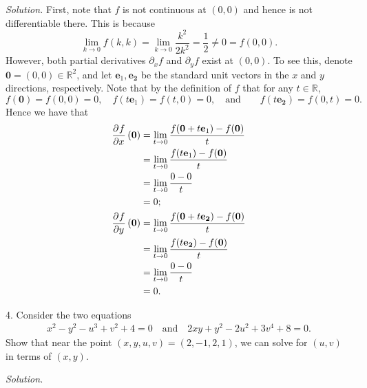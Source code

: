 \documentclass{article}
\newcommand{\0}{\mathbf{0}}
\newcommand{\ex}{\mathbf{e}_1}
\newcommand{\ey}{\mathbf{e_2}}
\newcommand{\R}{\mathbb{R}}
\begin{document}
\textit{Solution.}
First, note that $f$ is not continuous at $(0, 0)$ and hence is
not differentiable there. This is because
%
\begin{equation*}
    \lim_{k \to 0} f(k, k)
        = \lim_{k \to 0} \frac{k^2}{2 k^2}
        = \frac{1}{2} \neq 0
        = f(0, 0)
    .
\end{equation*}
%
However, both partial derivatives $\partial_x f$ and $\partial_y f$
exist at $(0, 0)$. To see this, denote $\0 = (0, 0) \in \R^2$, and let
$\ex, \ey$ be the standard unit vectors in the $x$ and $y$ directions,
respectively. Note that by the definition of $f$ that for any $t \in \R$,
%
\begin{equation*}
    f(\0) = f(0, 0) = 0, \quad
    f(t \ex) = f(t, 0) = 0, \quad
    \text{and} \qquad f(t \ey) = f(0, t) = 0
    .
\end{equation*}
%
Hence we have that
%
\begin{align*}
    \dpd{f}{x}(\0)
        &= \lim_{t \to 0} \frac{f(\0 + t \ex) - f(\0)}{t} \\
        &= \lim_{t \to 0} \frac{f(t \ex) - f(\0)}{t} \\
        &= \lim_{t \to 0} \frac{0 - 0}{t} \\
        &= 0; \\
    \dpd{f}{y}(\0)
        &= \lim_{t \to 0} \frac{f(\0 + t \ey) - f(\0)}{t} \\
        &= \lim_{t \to 0} \frac{f(t \ey) - f(\0)}{t} \\
        &= \lim_{t \to 0} \frac{0 - 0}{t} \\
        &= 0
        .
\end{align*}

\newpage

4. Consider the two equations
%
\begin{align*}
    x^2 - y^2 - u^3 + v^2 + 4 = 0
    \quad \text{and} \quad
    2 x y + y^2 - 2 u^2 + 3 v^4 + 8 = 0
    .
\end{align*}
%
Show that near the point $(x, y, u, v) = (2, -1, 2, 1)$, we can solve
for $(u, v)$ in terms of $(x, y)$.

\textit{Solution.}
\end{document}
